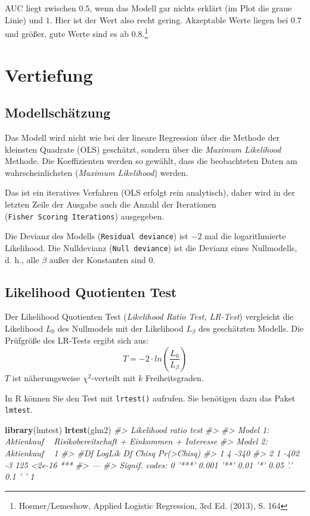 \documentclass[12pt,ngerman,]{book}
\makeatletter
\newenvironment{Shaded}{\begin{snugshade}}{\end{snugshade}}
\newcommand{\KeywordTok}[1]{\textcolor[rgb]{0.13,0.29,0.53}{\textbf{{#1}}}}
\newcommand{\CommentTok}[1]{\textcolor[rgb]{0.56,0.35,0.01}{\textit{{#1}}}}
\newcommand{\NormalTok}[1]{{#1}}
\let\rmarkdownfootnote\footnote%
\def\footnote{\protect\rmarkdownfootnote}
\newenvironment{kframe}{%
\medskip{}
\setlength{\fboxsep}{.8em}
 \def\at@end@of@kframe{}%
 \ifinner\ifhmode%
  \def\at@end@of@kframe{\end{minipage}}%
  \begin{minipage}{\columnwidth}%
 \fi\fi%
 \def\FrameCommand##1{\hskip\@totalleftmargin \hskip-\fboxsep
 \colorbox{shadecolor}{##1}\hskip-\fboxsep
     \hskip-\linewidth \hskip-\@totalleftmargin \hskip\columnwidth}%
 \MakeFramed {\advance\hsize-\width
   \@totalleftmargin\z@ \linewidth\hsize
   \@setminipage}}%
 {\par\unskip\endMakeFramed%
 \at@end@of@kframe}
\renewenvironment{Shaded}{\begin{kframe}}{\end{kframe}}
\makeatother
\begin{document}
AUC liegt zwischen \(0.5\), wenn das Modell gar nichts erklärt (im Plot
die graue Linie) und \(1\). Hier ist der Wert also recht gering.
Akzeptable Werte liegen bei \(0.7\) und größer, gute Werte sind es ab
\(0.8\).\footnote{Hosmer/Lemeshow, Applied Logistic Regression, 3rd Ed.
  (2013), S. 164}

\section{Vertiefung}\label{vertiefung}

\subsection{Modellschätzung}\label{modellschatzung}

Das Modell wird nicht wie bei der lineare Regression über die Methode
der kleinsten Quadrate (OLS) geschätzt, sondern über die \emph{Maximum
Likelihood} Methode. Die Koeffizienten werden so gewählt, dass die
beobachteten Daten am wahrscheinlichsten (\emph{Maximum Likelihood})
werden.

Das ist ein iteratives Verfahren (OLS erfolgt rein analytisch), daher
wird in der letzten Zeile der Ausgabe auch die Anzahl der Iterationen
(\texttt{Fisher\ Scoring\ Iterations}) ausgegeben.

Die Devianz des Modells (\texttt{Residual\ deviance}) ist \(-2\) mal die
logarithmierte Likelihood. Die Nulldevianz (\texttt{Null\ deviance}) ist
die Devianz eines Nullmodells, d. h., alle \(\beta\) außer der
Konstanten sind 0.

\subsection{Likelihood Quotienten
Test}\label{likelihood-quotienten-test}

Der Likelihood Quotienten Test (\emph{Likelihood Ratio Test, LR-Test})
vergleicht die Likelihood \(L_0\) des Nullmodels mit der Likelihood
\(L_{\beta}\) des geschätzten Modells. Die Prüfgröße des LR-Tests ergibt
sich aus: \[{T=-2\cdot ln\left( \frac{L_0}{L_{\beta}}\right)}\] \(T\)
ist näherungsweise \(\chi ^2\)-verteilt mit \(k\) Freiheitsgraden.

In R können Sie den Test mit \texttt{lrtest()} aufrufen. Sie benötigen
dazu das Paket \texttt{lmtest}.

\begin{Shaded}
\begin{Highlighting}[]
\KeywordTok{library}\NormalTok{(lmtest)}
\KeywordTok{lrtest}\NormalTok{(glm2)}
\CommentTok{#> Likelihood ratio test}
\CommentTok{#> }
\CommentTok{#> Model 1: Aktienkauf ~ Risikobereitschaft + Einkommen + Interesse}
\CommentTok{#> Model 2: Aktienkauf ~ 1}
\CommentTok{#>   #Df LogLik Df Chisq Pr(>Chisq)    }
\CommentTok{#> 1   4   -340                        }
\CommentTok{#> 2   1   -402 -3   125     <2e-16 ***}
\CommentTok{#> ---}
\CommentTok{#> Signif. codes:  0 '***' 0.001 '**' 0.01 '*' 0.05 '.' 0.1 ' ' 1}
\end{Highlighting}
\end{Shaded}
\end{document}
